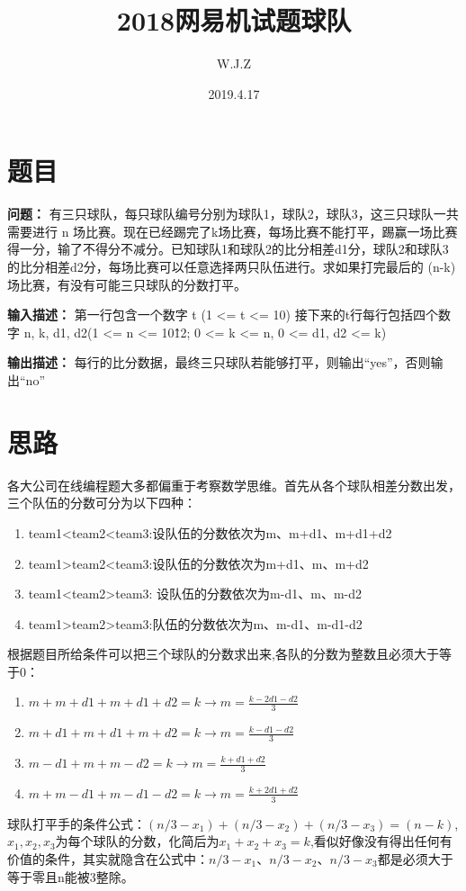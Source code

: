 \documentclass[a4paper]{article}
\title{2018网易机试题球队}
\author{W.J.Z}
\date{2019.4.17}
\begin{document}
	\maketitle
	\section{题目}
	\textbf{问题：} 有三只球队，每只球队编号分别为球队1，球队2，球队3，这三只球队一共需要进行 n 场比赛。现在已经踢完了k场比赛，每场比赛不能打平，踢赢一场比赛得一分，输了不得分不减分。已知球队1和球队2的比分相差d1分，球队2和球队3的比分相差d2分，每场比赛可以任意选择两只队伍进行。求如果打完最后的 (n-k) 场比赛，有没有可能三只球队的分数打平。  
	
	
	\textbf{输入描述：} 第一行包含一个数字 t (1 <= t <= 10)
	接下来的t行每行包括四个数字 n, k, d1, d2(1 <= n <= 10\^12; 0 <= k <= n, 0 <= d1, d2 <= k)
	
	
	\textbf{输出描述：} 每行的比分数据，最终三只球队若能够打平，则输出“yes”，否则输出“no”
	
	\section{思路}
	各大公司在线编程题大多都偏重于考察数学思维。首先从各个球队相差分数出发，三个队伍的分数可分为以下四种：
	
	\begin{enumerate}
		\item team1<team2<team3:设队伍的分数依次为m、m+d1、m+d1+d2
		\item team1>team2<team3:设队伍的分数依次为m+d1、m、m+d2
		\item team1<team2>team3: 设队伍的分数依次为m-d1、m、m-d2
		\item team1>team2>team3:队伍的分数依次为m、m-d1、m-d1-d2
	\end{enumerate}

	根据题目所给条件可以把三个球队的分数求出来,各队的分数为整数且必须大于等于0：
	\begin{enumerate}
		\item $m+m+d1+m+d1+d2 = k \rightarrow m=\frac{k-2d1-d2}{3}$
		\item $m+d1+m+d1+m+d2 = k \rightarrow m=\frac{k-d1-d2}{3}$
		\item $m-d1+m+m-d2 = k \rightarrow m=\frac{k+d1+d2}{3}$
		\item $m+m-d1+m-d1-d2 = k \rightarrow m=\frac{k+2d1+d2}{3}$
	\end{enumerate}
	
	球队打平手的条件公式：$(n/3-x_{1})+(n/3-x_{2})+(n/3-x_{3})=(n-k)$,$x_{1},x_{2},x_{3}$为每个球队的分数，化简后为$x_{1}+x_{2}+x_{3}=k$,看似好像没有得出任何有价值的条件，其实就隐含在公式中：$n/3-x_{1}$、$n/3-x_{2}$、$n/3-x_{3}$都是必须大于等于零且n能被3整除。
	
\end{document}
